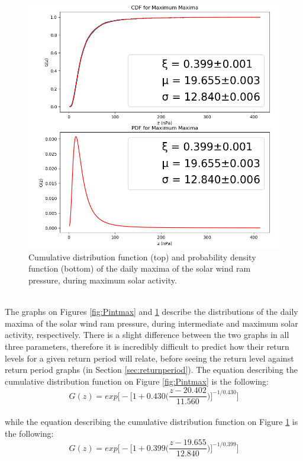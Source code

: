 \documentclass[11pt]{article}
\begin{document}
\begin{figure}[t!]
\begin{minipage}{0.48\textwidth}
                \includegraphics[width=\textwidth]{fig_method/Pmaxmax.png}
                \caption{Cumulative distribution function (top) and probability density function (bottom) of the daily maxima of the solar wind ram pressure, during maximum solar activity.}
                \label{fig:Pmaxmax}
            \end{minipage}
        \end{figure}\\
        The graphs on Figures \ref{fig:Pintmax} and \ref{fig:Pmaxmax} describe the distributions of the daily maxima of the solar wind ram pressure, during intermediate and maximum solar activity, respectively. There is a slight difference between the two graphs in all three parameters, therefore it is incredibly difficult to predict how their return levels for a given return period will relate, before seeing the return level against return period graphs (in Section \ref{sec:returnperiod}). The equation describing the cumulative distribution function on Figure \ref{fig:Pintmax} is the following:
        \begin{equation}
            G(z) = exp\Bigg [-\Bigg [1+0.430 \Bigg (\frac{z-20.402}{11.560}\Bigg )\Bigg ]^{-1/0.430}\Bigg ]
        \end{equation}\\
        while the equation describing the cumulative distribution function on Figure \ref{fig:Pmaxmax} is the following:
        \begin{equation}
            G(z) = exp\Bigg [-\Bigg [1+0.399 \Bigg (\frac{z-19.655}{12.840}\Bigg )\Bigg ]^{-1/0.399}\Bigg ]
        \end{equation}
\end{document}
